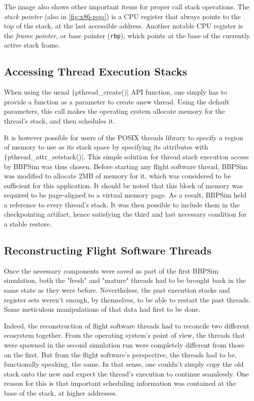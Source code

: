 The image also shows other important items for proper call stack operations. The \textit{stack pointer} (also in \autoref{fig:x86-regs}) is a CPU register that always points to the top of the stack, at the last accessible address. Another notable CPU register is the \textit{frame pointer}, or base pointer (\texttt{rbp}), which points at the base of the currently active stack frame. 

\subsection*{Accessing Thread Execution Stacks}
When using the usual \texttt|pthread_create()| API function, one simply has to provide a function as a parameter to create anew thread. Using the default parameters, this call makes the operating system allocate memory for the thread's stack, and then schedules it\cite{online:pthread-create}.

It is however possible for users of the POSIX threads library to specify a region of memory to use as its stack space by specifying its attributes with \texttt|pthread_attr_setstack()|. This simple solution for thread stack execution access by BBPSim was thus chosen. Before starting any flight software thread, \gls{BBPSim} was modified to allocate 2MB of memory for it, which was considered to be sufficient for this application. It should be noted that this block of memory was required to be page-aligned to a virtual memory page. As a result, BBPSim held a reference to every thread's stack. It was then possible to include them in the checkpointing artifact, hence satisfying the third and last necessary condition for a stable restore.

\subsection*{Reconstructing Flight Software Threads}
Once the necessary components were saved as part of the first BBPSim simulation, both the "fresh" and "mature" threads had to be brought back in the same state as they were before. Nevertheless, the past execution stacks and register sets weren't enough, by themselves, to be able to restart the past threads. Some meticulous manipulations of that data had first to be done. 

Indeed, the reconstruction of flight software threads had to reconcile two different ecosystem together. From the operating system's point of view, the threads that were spawned in the second simulation run were completely different from those on the first. But from the flight software's perspective, the threads had to be, functionally speaking, the same. In that sense, one couldn't simply copy the old stack onto the new and expect the thread's execution to continue seamlessly. One reason for this is that important scheduling information was contained at the base of the stack, at higher addresses. 

